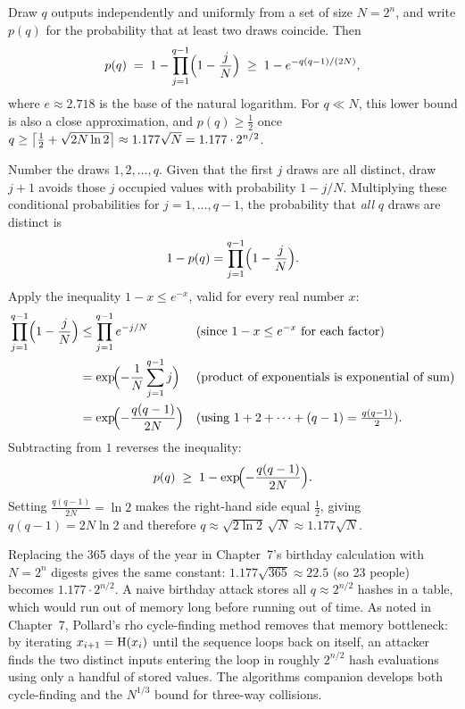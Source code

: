 \begin{theorem}
\label{ch14:thm-birthday}
Draw $q$ outputs independently and uniformly from a set of size $N = 2^{n}$, and write $p(q)$ for the probability that at least two draws coincide. Then
\[
  p(q) \;=\; 1 - \prod_{j=1}^{q-1}\Bigl(1 - \frac{j}{N}\Bigr)
        \;\ge\; 1 - e^{-q(q-1)/(2N)},
\]
where $e \approx 2.718$ is the base of the natural logarithm. For $q \ll N$, this lower bound is also a close approximation, and $p(q) \ge \tfrac12$ once $q \ge \ceil[\big]{\tfrac{1}{2} + \sqrt{2N\ln 2}} \approx 1.177\sqrt{N} = 1.177 \cdot 2^{n/2}$.
\end{theorem}

\begin{whybox}
Number the draws $1, 2, \dots, q$. Given that the first $j$ draws are all distinct, draw $j+1$ avoids those $j$ occupied values with probability $1 - j/N$. Multiplying these conditional probabilities for $j = 1, \dots, q-1$, the probability that \emph{all} $q$ draws are distinct is
\[
  1 - p(q) = \prod_{j=1}^{q-1}\Bigl(1 - \frac{j}{N}\Bigr).
\]
Apply the inequality $1 - x \le e^{-x}$, valid for every real number $x$:
\begin{align*}
  \prod_{j=1}^{q-1}\Bigl(1 - \frac{j}{N}\Bigr)
    &\le \prod_{j=1}^{q-1} e^{-j/N} &&\text{(since $1 - x \le e^{-x}$ for each factor)} \\
    &= \exp\!\Bigl(-\frac{1}{N}\sum_{j=1}^{q-1} j\Bigr) &&\text{(product of exponentials is exponential of sum)} \\
    &= \exp\!\Bigl(-\frac{q(q-1)}{2N}\Bigr) &&\text{(using $1 + 2 + \dots + (q-1) = \tfrac{q(q-1)}{2}$).}
\end{align*}
Subtracting from $1$ reverses the inequality:
\[
  p(q) \;\ge\; 1 - \exp\!\Bigl(-\frac{q(q-1)}{2N}\Bigr).
\]
Setting $\frac{q(q-1)}{2N} = \ln 2$ makes the right-hand side equal $\tfrac{1}{2}$, giving $q(q-1) = 2N\ln 2$ and therefore $q \approx \sqrt{2\ln 2}\,\sqrt{N} \approx 1.177\sqrt{N}$.
\end{whybox}

\begin{connectionbox}
Replacing the 365 days of the year in Chapter~7's birthday calculation with $N = 2^{n}$ digests gives the same constant: $1.177\sqrt{365} \approx 22.5$ (so 23 people) becomes $1.177 \cdot 2^{n/2}$. A naive birthday attack stores all $q \approx 2^{n/2}$ hashes in a table, which would run out of memory long before running out of time. As noted in Chapter~7, Pollard's rho cycle-finding method removes that memory bottleneck: by iterating $x_{i+1} = \Hash(x_i)$ until the sequence loops back on itself, an attacker finds the two distinct inputs entering the loop in roughly $2^{n/2}$ hash evaluations using only a handful of stored values. The algorithms companion develops both cycle-finding and the $N^{1/3}$ bound for three-way collisions.
\end{connectionbox}

